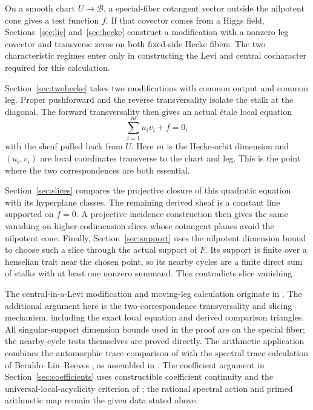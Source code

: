 On a smooth chart $U\to\mathcal B$, a special-fiber cotangent vector
outside the nilpotent cone gives a test function $f$. If that covector
comes from a Higgs field, Sections~\ref{sec:lie} and~\ref{sec:hecke}
construct a modification with a nonzero leg covector and transverse
zeros on both fixed-side Hecke fibers. The two characteristic regimes
enter only in constructing the Levi and central cocharacter required
for this calculation.

Section~\ref{sec:twohecke} takes two modifications with common output
and common leg. Proper pushforward and the reverse transversality
isolate the stalk at the diagonal. The forward transversality then
gives an actual \'{e}tale local equation
\[
 \sum_{i=1}^m u_i v_i+f=0,
\]
with the sheaf pulled back from $U$. Here $m$ is the Hecke-orbit
dimension and $(u_i,v_i)$ are local coordinates transverse to the
chart and leg. This is the point where the two correspondences are
both essential.

Section~\ref{sec:slices} compares the projective closure of this
quadratic equation with its hyperplane classes. The remaining derived
sheaf is a constant line supported on $f=0$. A projective incidence
construction then gives the same vanishing on higher-codimension
slices whose cotangent planes avoid the nilpotent cone.
Finally, Section~\ref{sec:support} uses the nilpotent dimension bound
to choose such a slice through the actual support of $F$. Its support
is finite over a henselian trait near the chosen point, so its nearby
cycles are a finite direct sum of stalks with at least one nonzero
summand. This contradicts slice vanishing.

The central-in-a-Levi modification and moving-leg calculation originate
in \cite[\S\S20.4--20.7]{AGKRRV}. The additional argument here is the
two-correspondence transversality and slicing mechanism, including
the exact local equation and derived comparison triangles. All
singular-support dimension bounds used in the proof are on the
special fiber; the nearby-cycle tests themselves are proved directly.
The arithmetic application combines the automorphic trace comparison
of \cite{AGKRRVTrace} with the spectral trace calculation of
Beraldo--Lin--Reeves \cite[\S\S6.4.12--6.4.13]{BeraldoLinReeves}, as
assembled in \cite[\S1.5]{GR}. The coefficient argument in
Section~\ref{sec:coefficients} uses constructible coefficient
continuity \cite{HemoRicharzScholbach} and the universal-local-acyclicity
criterion of \cite{HansenScholze}; the rational spectral action and
primed arithmetic map remain the given data stated above.
